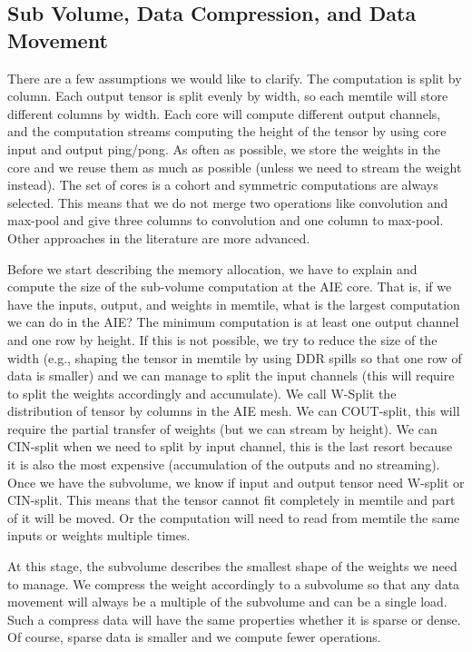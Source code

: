 \documentclass[conference]{IEEEtran}
\begin{document}
\subsection{Sub Volume, Data Compression, and Data Movement}
There are a few assumptions we would like to clarify. The computation
is split by column. Each output tensor is split evenly by width, so
each memtile will store different columns by width. Each core will
compute different output channels, and the computation streams
computing the height of the tensor by using core input and output
ping/pong. As often as possible, we store the weights in the core and
we reuse them as much as possible (unless we need to stream the weight
instead). The set of cores is a cohort and symmetric computations are
always selected. This means that we do not merge two operations like
convolution and max-pool and give three columns to convolution and one
column to max-pool. Other approaches in the literature are more
advanced.


Before we start describing the memory allocation, we have to explain
and compute the size of the sub-volume computation at the AIE core.
That is, if we have the inputs, output, and weights in memtile, what
is the largest computation we can do in the AIE? The minimum
computation is at least one output channel and one row by height. If
this is not possible, we try to reduce the size of the width (e.g.,
shaping the tensor in memtile by using DDR spills so that one row of
data is smaller) and we can manage to split the input channels (this
will require to split the weights accordingly and accumulate). We call
W-Split the distribution of tensor by columns in the AIE mesh. We can
COUT-split, this will require the partial transfer of weights (but we
can stream by height).  We can CIN-split when we need to split by
input channel, this is the last resort because it is also the most
expensive (accumulation of the outputs and no streaming). Once we have
the subvolume, we know if input and output tensor need W-split or
CIN-split. This means that the tensor cannot fit completely in memtile
and part of it will be moved. Or the computation will need to read
from memtile the same inputs or weights multiple times.

At this stage, the subvolume describes the smallest shape of the
weights we need to manage. We compress the weight accordingly to 
a subvolume so that any data movement will always be a multiple of the
subvolume and can be a single load. Such a compress data will have the
same properties whether it is sparse or dense. Of course, sparse data is
smaller and we compute fewer operations.
\end{document}
